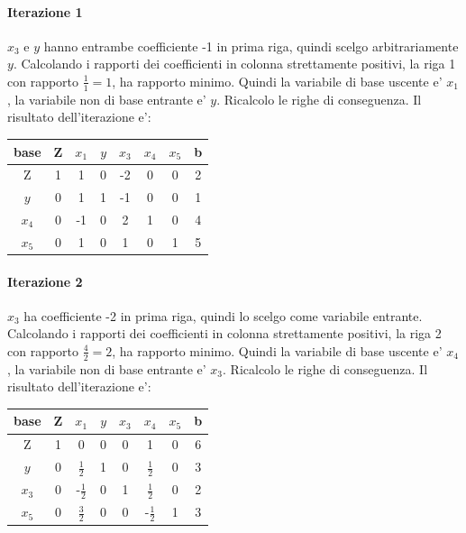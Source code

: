 \documentclass[a4paper,12pt,oneside]{article}
\begin{document}
    \paragraph{Iterazione 1}

    $x_3$ e $y$ hanno entrambe coefficiente -1 in prima riga, quindi scelgo arbitrariamente $y$.
    Calcolando i rapporti dei coefficienti in colonna strettamente positivi, la riga 1 con rapporto $\frac 1 1 = 1$, ha rapporto minimo.
    Quindi la variabile di base uscente e' $x_1$, la variabile non di base entrante e' $y$.
    Ricalcolo le righe di conseguenza. Il risultato dell'iterazione e':

    \begin{center}
        \begin{tabular}{||c c c c c c c c||}
            \hline
            base & Z & $x_1$ & $y$ & $x_3$ & $x_4$ & $x_5$ & b \\
            \hline
            \hline
            Z     & 1 &  1 &  0 & -2 & 0 & 0 &  2 \\
            \hline
            $y$   & 0 &  1 &  1 & -1 & 0 & 0 &  1 \\
            \hline
            $x_4$ & 0 & -1 &  0 &  2 & 1 & 0 &  4 \\
            \hline
            $x_5$ & 0 &  1 &  0 &  1 & 0 & 1 &  5 \\
            \hline
        \end{tabular}
    \end{center}

    \paragraph{Iterazione 2}
    
    $x_3$ ha coefficiente -2 in prima riga, quindi lo scelgo come variabile entrante.
    Calcolando i rapporti dei coefficienti in colonna strettamente positivi, la riga 2 con rapporto $\frac 4 2 = 2$, ha rapporto minimo.
    Quindi la variabile di base uscente e' $x_4$, la variabile non di base entrante e' $x_3$.
    Ricalcolo le righe di conseguenza. Il risultato dell'iterazione e':

    \begin{center}
        \begin{tabular}{||c c c c c c c c||}
            \hline
            base & Z & $x_1$ & $y$ & $x_3$ & $x_4$ & $x_5$ & b \\
            \hline
            \hline
            Z     & 1 &            0 &  0 &  0 &            1 & 0 &  6 \\
            \hline
            $y$   & 0 &  $\frac 1 2$ &  1 &  0 &  $\frac 1 2$ & 0 &  3 \\
            \hline
            $x_3$ & 0 & -$\frac 1 2$ &  0 &  1 &  $\frac 1 2$ & 0 &  2 \\
            \hline
            $x_5$ & 0 &  $\frac 3 2$ &  0 &  0 & -$\frac 1 2$ & 1 &  3 \\
            \hline
        \end{tabular}
    \end{center}
\end{document}
